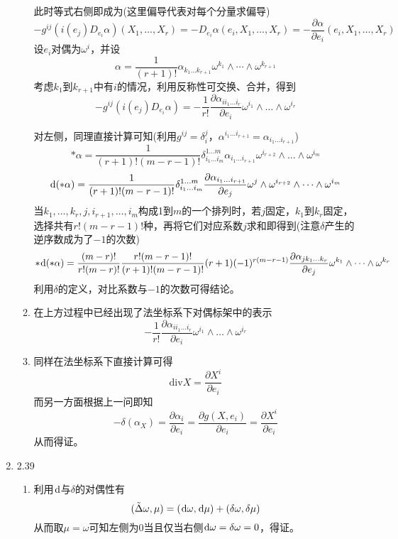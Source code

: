 \documentclass[a4paper,UTF8,fontset=windows,10pt]{ctexart}
\newcommand*{\dr}{\hspace{0.07em}\mathrm{d}}
\begin{document}
\begin{enumerate}
\begin{enumerate}[(1)]
        此时等式右侧即成为(这里偏导代表对每个分量求偏导)
        $$-g^{ij}(i(e_j)D_{e_i}\alpha)(X_1,\dots,X_r)=-D_{e_i}\alpha(e_i,X_1,\dots,X_r)=-\frac{\partial\alpha}{\partial e_i}(e_i,X_1,\dots,X_r)$$
        设$e_i$对偶为$\omega^i$，并设
        $$\alpha=\frac{1}{(r+1)!}\alpha_{k_1\dots k_{r+1}}\omega^{k_1}\wedge\cdots\wedge\omega^{k_{r+1}}$$
        考虑$k_1$到$k_{r+1}$中有$i$的情况，利用反称性可交换、合并，得到
        $$-g^{ij}(i(e_j)D_{e_i}\alpha)=-\frac{1}{r!}\frac{\partial\alpha_{ii_1\dots i_r}}{\partial e_i}\omega^{i_1}\wedge\dots\wedge\omega^{i_r}$$
    
        对左侧，同理直接计算可知(利用$g^{ij}=\delta_i^j$，$\alpha^{i_1\dots i_{r+1}}=\alpha_{i_1\dots i_{r+1}}$)
        $$*\alpha=\frac{1}{(r+1)!(m-r-1)!}\delta_{i_1\dots i_m}^{1\dots m}\alpha_{i_1\dots i_{r+1}}\omega^{i_{r+2}}\wedge\dots\wedge\omega^{i_m}$$
        $$\dr(*\alpha)=\frac{1}{(r+1)!(m-r-1)!}\delta_{i_1\dots i_m}^{1\dots m}\frac{\partial\alpha_{i_1\dots i_{r+1}}}{\partial e_j}\omega^j\wedge\omega^{i_{r+2}}\wedge\dots\wedge\omega^{i_m}$$
        当$k_1,\dots,k_r,j,i_{r+1},\dots,i_m$构成1到$m$的一个排列时，若$j$固定，$k_1$到$k_r$固定，选择共有$r!(m-r-1)!$种，再将它们对应系数$j$求和即得到(注意$\delta$产生的逆序数成为了$-1$的次数)
        $$*\dr(*\alpha)=\frac{(m-r)!}{r!(m-r)!}\frac{r!(m-r-1)!}{(r+1)!(m-r-1)!}(r+1)(-1)^{r(m-r-1)}\frac{\partial\alpha_{jk_1\dots k_r}}{\partial e_j}\omega^{k_1}\wedge\dots\wedge\omega^{k_r}$$
        利用$\delta$的定义，对比系数与$-1$的次数可得结论。
    
        \item 在上方过程中已经出现了法坐标系下对偶标架中的表示
        $$-\frac{1}{r!}\frac{\partial\alpha_{ii_1\dots i_r}}{\partial e_i}\omega^{i_1}\wedge\dots\wedge\omega^{i_r}$$
    
        \item 同样在法坐标系下直接计算可得
        $$\mathrm{div}X=\frac{\partial X^i}{\partial e_i}$$
        而另一方面根据上一问即知
        $$-\delta(\alpha_X)=\frac{\partial\alpha_i}{\partial e_i}=\frac{\partial g(X,e_i)}{\partial e_i}=\frac{\partial X^i}{\partial e_i}$$
        从而得证。
    \end{enumerate}
    
    
    \item 2.39
    \begin{enumerate}[(1)]
        \item 利用$\dr$与$\delta$的对偶性有
        $$(\tilde{\Delta}\omega,\mu)=(\dr\omega,\dr\mu)+(\delta\omega,\delta\mu)$$
        从而取$\mu=\omega$可知左侧为0当且仅当右侧$\dr\omega=\delta\omega=0$，得证。
    

\end{enumerate}
\end{enumerate}
\end{document}
